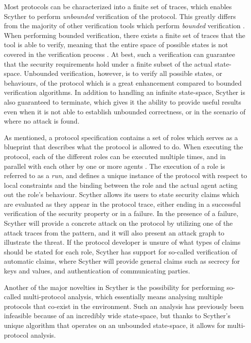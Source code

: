Most protocols can be characterized into a finite set of traces, which enables Scyther to perform \emph{unbounded} verification of the protocol. This greatly differs from the majority of other verification tools which perform \emph{bounded} verification \cite{cremers2008scyther, cremers2009comparing}. When performing bounded verification, there exists a finite set of traces that the tool is able to verify, meaning that the entire space of possible states is not covered in the verification process \cite{cremers2008unbounded}. At best, such a verification can guarantee that the security requirements hold under a finite subset of the actual state-space. Unbounded verification, however, is to verify all possible states, or behaviours, of the protocol which is a great enhancement compared to bounded verification algorithms. In addition to handling an infinite state-space, Scyther is also guaranteed to terminate, which gives it the ability to provide useful results even when it is not able to establish unbounded correctness, or in the scenario of where no attack is found.

As mentioned, a protocol specification contains a set of roles which serves as a blueprint that describes what the protocol is allowed to do. When executing the protocol, each of the different roles can be executed multiple times, and in parallel with each other by one or more agents \cite{cremers2006scyther}. The execution of a role is referred to as a \emph{run}, and defines a unique instance of the protocol with respect to local constraints and the binding between the role and the actual agent acting out the role's behaviour. Scyther allows its users to state security claims which are evaluated as they appear in the protocol trace, either ending in a successful verification of the security property or in a failure. In the presence of a failure, Scyther will provide a concrete attack on the protocol by utilizing one of the attack traces from the pattern, and it will also present an attack graph to illustrate the threat. If the protocol developer is unsure of what types of claims should be stated for each role, Scyther has support for so-called verification of automatic claims, where Scyther will provide general claims such as secrecy for keys and values, and authentication of communicating parties.

Another of the major novelties in Scyther is the possibility for performing so-called multi-protocol analysis, which essentially means analysing multiple protocols that co-exist in the environment. Such an analysis has previously been infeasible because of an incredibly wide state-space, but thanks to Scyther's unique algorithm that operates on an unbounded state-space, it allows for multi-protocol analysis.

